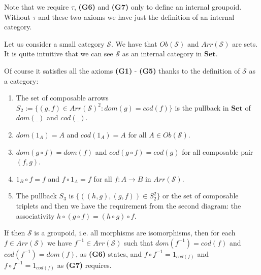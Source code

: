 \begin{oss*}
    Note that we require $\tau$, \textbf{(G6)} and \textbf{(G7)} only to define an internal groupoid. Without $\tau$ and these two axioms we have just the definition of an internal category.
\end{oss*}

\begin{example}
\label{ex:InternalCategorySets}
    Let us consider a small category $\mathcal{S}$. We have that $Ob(\mathcal{S})$ and $Arr(\mathcal{S})$ are sets. It is quite intuitive that we can see $\mathcal{S}$ as an internal category in $\textbf{Set}$. 

    \begin{center}
    \end{center}

    Of course it satisfies all the axioms \textbf{(G1)} - \textbf{(G5)} thanks to the definition of $\mathcal{S}$ as a category:
    \begin{enumerate}[\bfseries (G1)]
        \item The set of composable arrows $S_2 := \{(g,f)\in Arr(\mathcal{S})^2 : dom(g) = cod(f)\}$ is the pullback in $\textbf{Set}$ of $dom(\_)$ and $cod(\_)$.
        \item $dom(1_A) = A$ and $cod(1_A) = A$ for all $A \in Ob(\mathcal{S})$.
        \item $dom(g\circ f) = dom(f)$ and $cod(g\circ f) = cod(g)$ for all composable pair $(f,g)$.
        \item $1_B \circ f = f$ and $f \circ 1_A = f$ for all $f:A\to B$ in $Arr(\mathcal{S}).$
        \item The pullback $S_3$ is $\{ ((h,g), (g,f))\in S_2^2\}$ or the set of composable triplets and then we have the requirement from the second diagram: the associativity $h \circ (g \circ f) = (h \circ g) \circ f $.
    \end{enumerate}

    If then $\mathcal{S}$ is a groupoid, i.e. all morphisms are isomorphisms, then for each $f\in Arr(\mathcal{S})$ we have $f^{-1} \in Arr(\mathcal{S})$ such that $dom(f^{-1}) = cod(f)$ and $cod(f^{-1}) = dom(f)$, as \textbf{(G6)} states, and $f\circ f^{-1} = 1_{cod(f)}$ and $f\circ f^{-1} = 1_{cod(f)}$ as \textbf{(G7)} requires.
\end{example}

